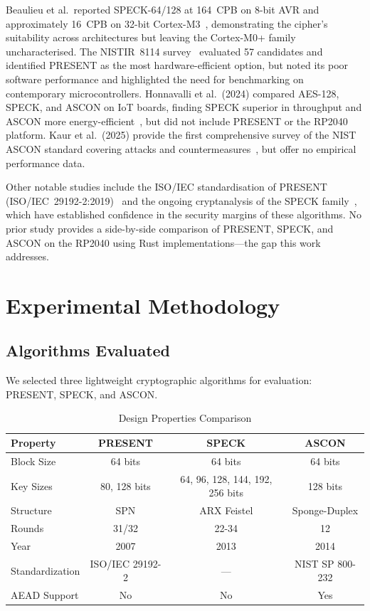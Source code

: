\documentclass[12pt]{report}
\begin{document}
Beaulieu et al.\ reported SPECK-64/128 at 164~CPB on 8-bit AVR and
approximately 16~CPB on 32-bit Cortex-M3~\cite{beaulieu2015simon},
demonstrating the cipher's suitability across architectures but leaving
the Cortex-M0+ family uncharacterised. The NISTIR~8114 survey~\cite{mckay2017nist}
evaluated 57 candidates and identified PRESENT as the most hardware-efficient
option, but noted its poor software performance and highlighted the need for
benchmarking on contemporary microcontrollers. Honnavalli et al.~(2024)
compared AES-128, SPECK, and ASCON on IoT boards, finding SPECK superior in
throughput and ASCON more energy-efficient~\cite{honnavalli2024}, but did not
include PRESENT or the RP2040 platform. Kaur et al.~(2025) provide the first
comprehensive survey of the NIST ASCON standard covering attacks and
countermeasures~\cite{kaur2024}, but offer no empirical performance data.

Other notable studies include the ISO/IEC standardisation of PRESENT
(ISO/IEC~29192-2:2019)~\cite{iso29192} and the ongoing cryptanalysis of the
SPECK family~\cite{ashur2018simon}, which have established confidence in the
security margins of these algorithms. No prior study provides a side-by-side
comparison of PRESENT, SPECK, and ASCON on the RP2040 using Rust
implementations---the gap this work addresses.

\chapter{Experimental Methodology}

\section{Algorithms Evaluated}

We selected three lightweight cryptographic algorithms for evaluation: PRESENT, SPECK, and ASCON.

\begin{table}[H]
    \centering
    \begin{tabular}{lccc}
        \toprule
        \textbf{Property} & \textbf{PRESENT} & \textbf{SPECK} & \textbf{ASCON} \\
        \midrule
        Block Size & 64 bits & 64 bits & 64 bits \\
        Key Sizes & 80, 128 bits & 64, 96, 128, 144, 192, 256 bits & 128 bits \\
        Structure & SPN & ARX Feistel & Sponge-Duplex \\
        Rounds & 31/32 & 22-34 & 12 \\
        Year & 2007 & 2013 & 2014 \\
        Standardization & ISO/IEC 29192-2 & --- & NIST SP 800-232 \\
        AEAD Support & No & No & Yes \\
        \bottomrule
    \end{tabular}
    \caption{Design Properties Comparison}
    \label{tab:design-comparison}
\end{table}
\end{document}
